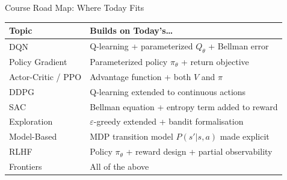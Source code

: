 \begin{frame}{Course Road Map: Where Today Fits}
    \centering
    \begin{tabular}{l l}
    \hline
    \textbf{Topic} & \textbf{Builds on Today's\ldots} \\
    \hline
    DQN & Q-learning + parameterized $Q_\theta$ + Bellman error \\
    Policy Gradient & Parameterized policy $\pi_\theta$ + return objective \\
    Actor-Critic / PPO & Advantage function + both $V$ and $\pi$ \\
    DDPG & Q-learning extended to continuous actions \\
    SAC & Bellman equation + entropy term added to reward \\
    Exploration & $\varepsilon$-greedy extended + bandit formalisation \\
    Model-Based & MDP transition model $P(s'|s,a)$ made explicit \\
    RLHF & Policy $\pi_\theta$ + reward design + partial observability \\
    Frontiers & All of the above \\
    \hline
    \end{tabular}
\end{frame}
